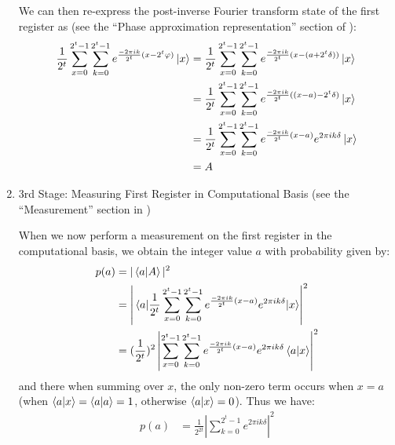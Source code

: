 \documentclass{article}
\begin{document}
\begin{enumerate}[label=\textbf{(\arabic*)}]
We can then re-express the post-inverse Fourier transform state of the first register as (see the ``Phase approximation representation'' section of \cite{wikipedia:qpe}):
\begin{align}
    \frac{1}{2^t}
      \sum_{x=0}^{2^t-1}
      \sum_{k=0}^{2^t-1}
      e^{\frac{-2\pi i k}{2^t}(x-2^{t}\varphi)} \ket{x}
    &=
    \frac{1}{2^t}
      \sum_{x=0}^{2^t-1}
      \sum_{k=0}^{2^t-1}
      e^{\frac{-2\pi i k}{2^t}(x-(a+2^{t}\delta))} \ket{x}\\
    &=
    \frac{1}{2^t}
      \sum_{x=0}^{2^t-1}
      \sum_{k=0}^{2^t-1}
      e^{\frac{-2\pi i k}{2^t}((x-a)-2^{t}\delta)} \ket{x}\\
    &=
    \frac{1}{2^t}
      \sum_{x=0}^{2^t-1}
      \sum_{k=0}^{2^t-1}
      e^{\frac{-2\pi i k}{2^t}(x-a)}
      e^{2\pi i k\delta}
      \ket{x}\\
    &=
    A
\end{align}


\item 3rd Stage: Measuring First Register in Computational Basis (see the ``Measurement'' section in \cite{wikipedia:qpe})

\vspace{0.1in}

When we now perform a measurement on the first register in the computational basis, we obtain the integer value $a$ with probability given by:
\begin{align}
    p(a)
    &=
    |\braket{a}{A}|^{2}\\
    &=
    \left|\matrixel{a}{\frac{1}{2^t}
      \sum_{x=0}^{2^t-1}
      \sum_{k=0}^{2^t-1}
      e^{\frac{-2\pi i k}{2^t}(x-a)}
      e^{2\pi i k\delta}}{x}\right|^{2}\\
    &=
    (\frac{1}{2^t})^2
    \left|
      \sum_{x=0}^{2^t-1}
      \sum_{k=0}^{2^t-1}
      e^{\frac{-2\pi i k}{2^t}(x-a)}
      e^{2\pi i k\delta}\bra{a}\ket{x}
    \right|^{2}
\end{align}
and there when summing over $x$, the only non-zero term occurs when $x=a$ (when $\bra{a}\ket{x}=\bra{a}\ket{a}=1$, otherwise $\bra{a}\ket{x} = 0$). Thus we have:
\begin{align}
    p(a)
    &=
    \frac{1}{2^{2t}}
    \left|
      \sum_{k=0}^{2^t-1}
      e^{2\pi i k\delta}
    \right|^{2}
\end{align}


\end{enumerate}
\end{document}
